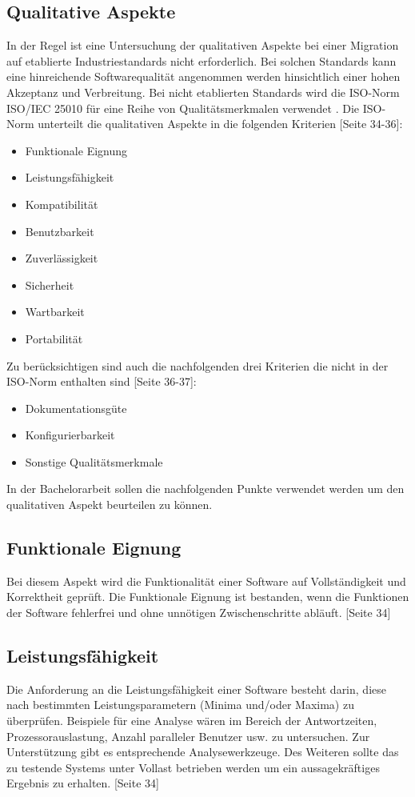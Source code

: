 \subsection{Qualitative Aspekte}
In der Regel ist eine Untersuchung der qualitativen Aspekte bei einer Migration auf etablierte Industriestandards nicht erforderlich. Bei solchen Standards kann eine hinreichende Softwarequalität angenommen werden hinsichtlich einer hohen Akzeptanz und Verbreitung. Bei nicht etablierten Standards wird die ISO-Norm ISO/IEC 25010 für eine Reihe von Qualitätsmerkmalen verwendet \cite{ISO}. Die ISO-Norm unterteilt die qualitativen Aspekte in die folgenden Kriterien \cite{BUND12}[Seite 34-36]:
\begin{itemize}
  \item Funktionale Eignung
  \item Leistungsfähigkeit
  \item Kompatibilität
  \item Benutzbarkeit
  \item Zuverlässigkeit
  \item Sicherheit
  \item Wartbarkeit
  \item Portabilität
\end{itemize}
Zu berücksichtigen sind auch die nachfolgenden drei Kriterien die nicht in der ISO-Norm enthalten sind \cite{BUND12}[Seite 36-37]:
\begin{itemize}
  \item Dokumentationsgüte
  \item Konfigurierbarkeit
  \item Sonstige Qualitätsmerkmale
\end{itemize}
In der Bachelorarbeit sollen die nachfolgenden Punkte verwendet werden um den qualitativen Aspekt beurteilen zu können.
\subsection*{Funktionale Eignung}
Bei diesem Aspekt wird die Funktionalität einer Software auf Vollständigkeit und Korrektheit geprüft. Die Funktionale Eignung ist bestanden, wenn die Funktionen der Software fehlerfrei und ohne unnötigen Zwischenschritte abläuft. \cite{BUND12}[Seite 34]
\subsection*{Leistungsfähigkeit}
Die Anforderung an die Leistungsfähigkeit einer Software besteht darin, diese nach bestimmten Leistungsparametern (Minima und/oder Maxima) zu überprüfen. Beispiele für eine Analyse wären im Bereich der Antwortzeiten, Prozessorauslastung, Anzahl paralleler Benutzer usw. zu untersuchen. Zur Unterstützung gibt es entsprechende Analysewerkzeuge. Des Weiteren sollte das zu testende Systems unter Vollast betrieben werden um ein aussagekräftiges Ergebnis zu erhalten. \cite{BUND12}[Seite 34]
